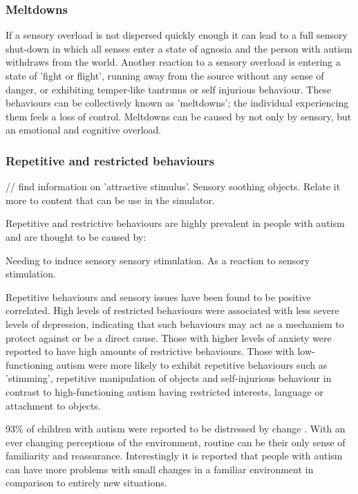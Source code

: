 \documentclass[11pt]{report}
\begin{document}
\subsubsection{Meltdowns}
If a sensory overload is not dispersed quickly enough it can lead to a full sensory shut-down in which all senses enter a state of agnosia and the person with autism withdraws from the world. Another reaction to a sensory overload is entering a state of 'fight or flight', running away from the source without any sense of danger, or exhibiting temper-like tantrums or self injurious behaviour. These behaviours can be collectively known as 'meltdowns'; the individual experiencing them feels a loss of control. Meltdowns can be caused by not only by sensory, but an emotional and cognitive overload.

\subsubsection{Repetitive and restricted behaviours}
// find information on 'attractive stimulus'. Sensory soothing objects. Relate it more to content that can be use in the simulator.

Repetitive and restrictive behaviours are highly prevalent in people with autism and are thought to be caused by:
\begin{enumerate}
\list Needing to induce sensory sensory stimulation.
\list As a reaction to sensory stimulation.
\end{enumerate}

Repetitive behaviours and sensory issues have been found to be positive correlated\cite{rrs_sensory}\cite{rssyouth}. High levels of restricted behaviours were associated with less severe levels of depression, indicating that such behaviours may act as a mechanism to protect against or be a direct cause\cite{rss_ensory}. Those with higher levels of anxiety were reported to have high amounts of restrictive behaviours\cite{rssyouth}. Those with low-functioning autism were more likely to exhibit repetitive behaviours such as 'stimming', repetitive manipulation of objects and self-injurious behaviour in contrast to high-functioning autism having restricted interests, language or attachment to objects\cite{rss_sensory}.

93\% of children with autism were reported to be distressed by change \cite{fears}. With an ever changing perceptions of the environment, routine can be their only sense of familiarity and reassurance. Interestingly it is reported that people with autism can have more problems with small changes in a familiar environment in comparison to entirely new situations\cite{bayes}.  
\end{document}
